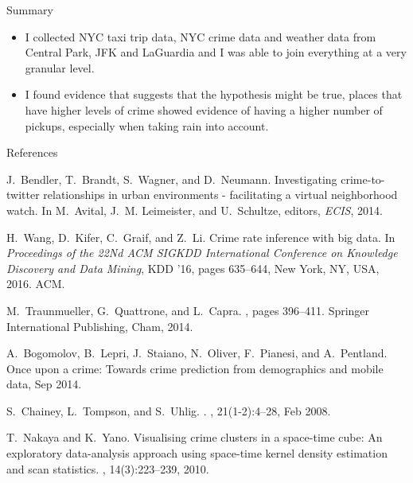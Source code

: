 \documentclass[10pt,ignorenonframetext,]{beamer}
\begin{document}
\begin{frame}{%
\protect\hypertarget{summary}{%
Summary}}

\begin{itemize}
\item
  I collected NYC taxi trip data, NYC crime data and weather data from
  Central Park, JFK and LaGuardia and I was able to join everything at a
  very granular level.
\item
  I found evidence that suggests that the hypothesis might be true,
  places that have higher levels of crime showed evidence of having a
  higher number of pickups, especially when taking rain into account.
\end{itemize}

\end{frame}

\begin{frame}{%
\protect\hypertarget{references}{%
References}}

\begin{thebibliography}{1}

J.~Bendler, T.~Brandt, S.~Wagner, and D.~Neumann.
\newblock Investigating crime-to-twitter relationships in urban environments -
  facilitating a virtual neighborhood watch.
\newblock In M.~Avital, J.~M. Leimeister, and U.~Schultze, editors, {\em ECIS},
  2014.

H.~Wang, D.~Kifer, C.~Graif, and Z.~Li.
\newblock Crime rate inference with big data.
\newblock In {\em Proceedings of the 22Nd ACM SIGKDD International Conference
  on Knowledge Discovery and Data Mining}, KDD '16, pages 635--644, New York,
  NY, USA, 2016. ACM.

M.~Traunmueller, G.~Quattrone, and L.~Capra.
, pages 396--411.
\newblock Springer International Publishing, Cham, 2014.
\end{thebibliography}

\end{frame}

\begin{frame}

\begin{thebibliography}{1}
A.~Bogomolov, B.~Lepri, J.~Staiano, N.~Oliver, F.~Pianesi, and A.~Pentland.
\newblock Once upon a crime: Towards crime prediction from demographics and
  mobile data, Sep 2014.

S.~Chainey, L.~Tompson, and S.~Uhlig.
.
, 21(1-2):4--28, Feb 2008.

T.~Nakaya and K.~Yano.
\newblock Visualising crime clusters in a space-time cube: An exploratory
  data-analysis approach using space-time kernel density estimation and scan
  statistics.
, 14(3):223--239, 2010.
\end{thebibliography}

\end{frame}
\end{document}
